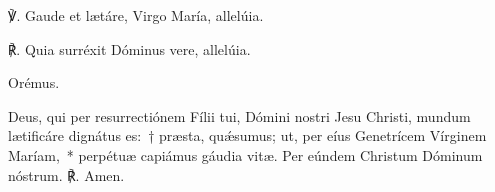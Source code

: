 
\noindent ℣. Gaude et lætáre, Virgo María, allelúia.

\noindent ℟. Quia surréxit Dóminus vere, allelúia.

Orémus.

\noindent Deus, qui per resurrectiónem Fílii tui, Dómini nostri Jesu Christi, mundum lætificáre dignátus es:~† præsta, quǽsumus; ut, per eíus Genetrícem Vírginem Maríam,~* perpétuæ capiámus gáudia vitæ. Per eúndem Christum Dóminum nóstrum.  ℟. Amen.